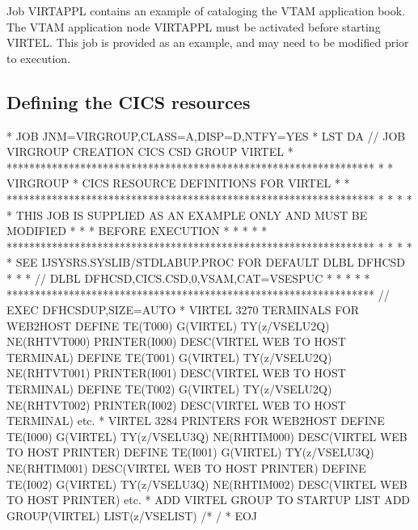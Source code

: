 \documentclass[letterpaper,10pt,english]{sphinxmanual}
\begin{document}
\sphinxAtStartPar
{}

\sphinxAtStartPar
Job VIRTAPPL contains an example of cataloging the VTAM application book. The VTAM application node VIRTAPPL must be activated before starting VIRTEL. This job is provided as an example, and may need to be modified prior to execution.


\subsection{Defining the CICS resources}
\label{\detokenize{Installation_Guide:defining-the-cics-resources}}
\begin{sphinxVerbatim}[commandchars=\\\{\}]
* \PYGZdl{}\PYGZdl{} JOB JNM=VIRGROUP,CLASS=A,DISP=D,NTFY=YES
* \PYGZdl{}\PYGZdl{} LST DA
// JOB VIRGROUP CREATION CICS CSD GROUP VIRTEL
* *****************************************************************
* * VIRGROUP * CICS RESOURCE DEFINITIONS FOR VIRTEL *
* *****************************************************************
* * *
* * THIS JOB IS SUPPLIED AS AN EXAMPLE ONLY AND MUST BE MODIFIED *
* * BEFORE EXECUTION *
* * *
* *****************************************************************
* * *
* * SEE IJSYSRS.SYSLIB/STDLABUP.PROC FOR DEFAULT DLBL DFHCSD *
* * // DLBL DFHCSD,\PYGZsq{}CICS.CSD\PYGZsq{},0,VSAM,CAT=VSESPUC *
* * *
* *****************************************************************
// EXEC DFHCSDUP,SIZE=AUTO
* VIRTEL 3270 TERMINALS FOR WEB2HOST
  DEFINE TE(T000) G(VIRTEL) TY(z/VSELU2Q) NE(RHTVT000) PRINTER(I000)
      DESC(VIRTEL WEB TO HOST TERMINAL)
  DEFINE TE(T001) G(VIRTEL) TY(z/VSELU2Q) NE(RHTVT001) PRINTER(I001)
      DESC(VIRTEL WEB TO HOST TERMINAL)
  DEFINE TE(T002) G(VIRTEL) TY(z/VSELU2Q) NE(RHTVT002) PRINTER(I002)
      DESC(VIRTEL WEB TO HOST TERMINAL)
      etc.
* VIRTEL 3284 PRINTERS FOR WEB2HOST
  DEFINE TE(I000) G(VIRTEL) TY(z/VSELU3Q) NE(RHTIM000)
      DESC(VIRTEL WEB TO HOST PRINTER)
  DEFINE TE(I001) G(VIRTEL) TY(z/VSELU3Q) NE(RHTIM001)
      DESC(VIRTEL WEB TO HOST PRINTER)
  DEFINE TE(I002) G(VIRTEL) TY(z/VSELU3Q) NE(RHTIM002)
      DESC(VIRTEL WEB TO HOST PRINTER)
    etc.
* ADD VIRTEL GROUP TO STARTUP LIST
  ADD GROUP(VIRTEL) LIST(z/VSELIST)
 /*
/\PYGZam{}
* \PYGZdl{}\PYGZdl{} EOJ
\end{sphinxVerbatim}

\sphinxAtStartPar
{}
\end{document}
